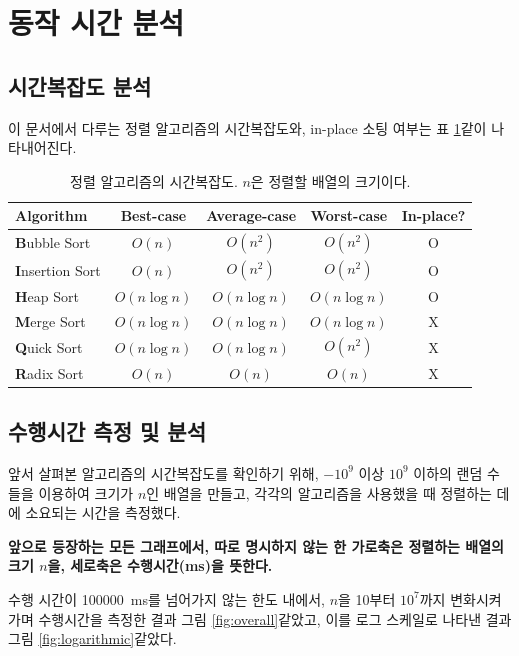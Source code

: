 \documentclass{article}
\begin{document}
	\clearpage
	
	\section{동작 시간 분석}
	\subsection{시간복잡도 분석}
	이 문서에서 다루는 정렬 알고리즘의 시간복잡도와,
	in-place 소팅 여부는 표 \ref{tab:bigo}\와 같이 나타내어진다.
	
	\begin{table}[h]
		\centering
		\begin{tabular}{|l|c|c|c|c|}
			\hline
			Algorithm & Best-case & Average-case & Worst-case & In-place? \\
			\hline
			\textbf{B}ubble Sort & $ O(n) $ & $ O(n^{2}) $ & $ O(n^{2}) $ & O \\
			\hline
			\textbf{I}nsertion Sort & $ O(n) $ & $ O(n^{2}) $ & $ O(n^{2}) $ & O \\
			\hline
			\textbf{H}eap Sort & $ O(n\log{n}) $ & $ O(n\log{n}) $ & $ O(n\log{n}) $ & O \\
			\hline
			\textbf{M}erge Sort & $ O(n\log{n}) $ & $ O(n\log{n}) $ & $ O(n\log{n}) $ & X \\
			\hline
			\textbf{Q}uick Sort & $ O(n\log{n}) $ & $ O(n\log{n}) $ & $ O(n^{2}) $ & X \\
			\hline
			\textbf{R}adix Sort & $ O(n) $ & $ O(n) $ & $ O(n) $ & X \\
			\hline
		\end{tabular}
		\caption{%
			정렬 알고리즘의 시간복잡도.
			$ n $은 정렬할 배열의 크기이다.
		}
		\label{tab:bigo}
	\end{table}

	\subsection{수행시간 측정 및 분석}
	앞서 살펴본 알고리즘의 시간복잡도를 확인하기 위해,
	$ -10^{9} $ 이상 $ 10^{9} $ 이하의 랜덤 수들을 이용하여
	크기가 $ n $인 배열을 만들고, 각각의 알고리즘을 사용했을 때 정렬하는 데에 소요되는 시간을
	측정했다.
	
	\textbf{앞으로 등장하는 모든 그래프에서, 따로 명시하지 않는 한 가로축은 정렬하는 배열의 크기 $ n $을,
	세로축은 수행시간(\si{\milli\second})을 뜻한다.}
	
	수행 시간이 \SI{100000}{\milli\second}를 넘어가지 않는 한도 내에서,
	$ n $을 10부터 $ 10^{7} $까지 변화시켜가며 수행시간을 측정한 결과
	그림 \ref{fig:overall}\와 같았고, 이를 로그 스케일로 나타낸 결과
	그림 \ref{fig:logarithmic}\와 같았다.
	
\end{document}
